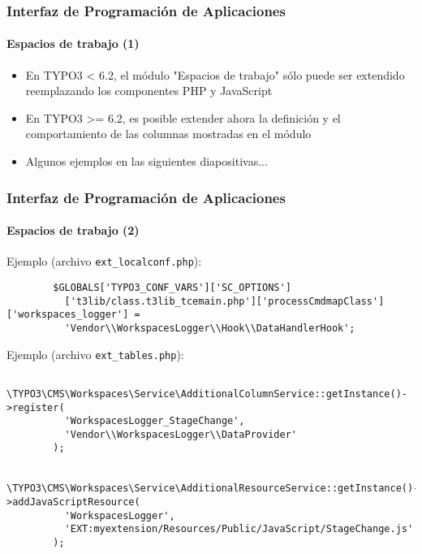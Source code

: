 
\begin{frame}[fragile]
	\frametitle{Interfaz de Programación de Aplicaciones}
	\framesubtitle{Espacios de trabajo (1)}

	\begin{itemize}
		\item En TYPO3 < 6.2, el módulo "Espacios de trabajo" sólo puede ser extendido reemplazando los componentes PHP y JavaScript
		\item En TYPO3 >= 6.2, es posible extender ahora la definición y el comportamiento de las columnas mostradas en el módulo
		\item Algunos ejemplos en las siguientes diapositivas...
	\end{itemize}

\end{frame}


\begin{frame}[fragile]
	\frametitle{Interfaz de Programación de Aplicaciones}
	\framesubtitle{Espacios de trabajo (2)}

	\lstset{
		basicstyle=\tiny\ttfamily
	}

	Ejemplo (archivo \texttt{ext\_localconf.php}):

	\begin{lstlisting}
		$GLOBALS['TYPO3_CONF_VARS']['SC_OPTIONS']
		  ['t3lib/class.t3lib_tcemain.php']['processCmdmapClass']['workspaces_logger'] =
		  'Vendor\\WorkspacesLogger\\Hook\\DataHandlerHook';
	\end{lstlisting}

	Ejemplo (archivo \texttt{ext\_tables.php}):

	\begin{lstlisting}
		\TYPO3\CMS\Workspaces\Service\AdditionalColumnService::getInstance()->register(
		  'WorkspacesLogger_StageChange',
		  'Vendor\\WorkspacesLogger\\DataProvider'
		);

		\TYPO3\CMS\Workspaces\Service\AdditionalResourceService::getInstance()->addJavaScriptResource(
		  'WorkspacesLogger',
		  'EXT:myextension/Resources/Public/JavaScript/StageChange.js'
		);
	\end{lstlisting}

\end{frame}

